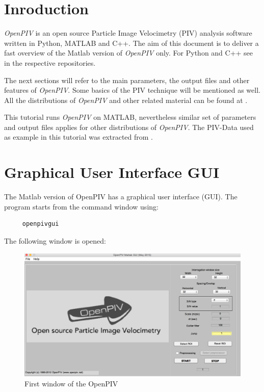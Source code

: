 \section{Inroduction}\label{Intro}

\emph{OpenPIV} is an open source Particle Image Velocimetry (PIV) analysis software written in 
Python, MATLAB and C++. The aim of this document is to deliver a fast overview of the Matlab version of \emph{OpenPIV} only. For Python and C++ see in the respective repositories.
 
The next sections will refer to the main parameters, the output files and other features 
of \emph{OpenPIV}. Some basics of the PIV technique will be mentioned as well. All the distributions  of \emph{OpenPIV} and other related material can be found at \cite{Liberzon:2009,Taylor:2010}.


This tutorial runs \emph{OpenPIV} on MATLAB, nevertheless similar set of parameters and output files applies for other distributions  of \emph{OpenPIV}. The PIV-Data used as example in this tutorial was extracted from \cite{carlier_2005}.

\section{Graphical User Interface GUI}\label{GUI}

The Matlab version of OpenPIV has a graphical user interface (GUI). The program starts from the command window using:



\begin{lstlisting}
	 openpivgui
\end{lstlisting}



The following window is opened:
\begin{figure}[H]
	\centering
	\includegraphics[width=\textwidth]{Images/open_window.png}
	\caption{First window of the OpenPIV}
	\label{fig:open_window}
\end{figure}

